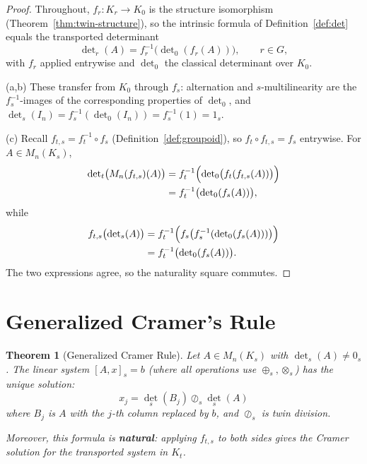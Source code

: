 \documentclass[11pt,twocolumn]{article}
\theoremstyle{plain}
\newtheorem{theorem}{Theorem}
\theoremstyle{definition}
\theoremstyle{remark}
\begin{document}
\begin{proof}
Throughout, $f_r: K_r \to K_0$ is the structure isomorphism (Theorem~\ref{thm:twin-structure}), so the intrinsic formula of Definition~\ref{def:det} equals the transported determinant
\[
\det\nolimits_r(A) = f_r^{-1}\bigl(\det\nolimits_0(f_r(A))\bigr), \qquad r \in G,
\]
with $f_r$ applied entrywise and $\det_0$ the classical determinant over $K_0$.

(a,b) These transfer from $K_0$ through $f_s$: alternation and $s$-multilinearity are the $f_s^{-1}$-images of the corresponding properties of $\det_0$, and $\det_s(I_n) = f_s^{-1}(\det_0(I_n)) = f_s^{-1}(1) = 1_s$.

(c) Recall $f_{t,s} = f_t^{-1} \circ f_s$ (Definition~\ref{def:groupoid}), so $f_t \circ f_{t,s} = f_s$ entrywise. For $A \in M_n(K_s)$,
\begin{align}
\det\nolimits_t\bigl(M_n(f_{t,s})(A)\bigr)
&= f_t^{-1}\Bigl(\det\nolimits_0\bigl(f_t(f_{t,s}(A))\bigr)\Bigr) \notag\\
&= f_t^{-1}\bigl(\det\nolimits_0(f_s(A))\bigr),
\end{align}
while
\begin{align}
f_{t,s}\bigl(\det\nolimits_s(A)\bigr)
&= f_t^{-1}\Bigl(f_s\bigl(f_s^{-1}(\det\nolimits_0(f_s(A)))\bigr)\Bigr) \notag\\
&= f_t^{-1}\bigl(\det\nolimits_0(f_s(A))\bigr).
\end{align}
The two expressions agree, so the naturality square commutes.
\end{proof}


\section{Generalized Cramer's Rule}
\label{sec:cramer}

\begin{theorem}[Generalized Cramer Rule]\label{thm:cramer}
Let $A \in M_n(K_s)$ with $\det_s(A) \neq 0_s$. The linear system $[A, x]_s = b$ (where all operations use $\oplus_s, \otimes_s$) has the unique solution:
\begin{equation}
\boxed{x_j = \det_s(B_j) \oslash_s \det_s(A)}
\end{equation}
where $B_j$ is $A$ with the $j$-th column replaced by $b$, and $\oslash_s$ is twin division.

Moreover, this formula is \textbf{natural}: applying $f_{t,s}$ to both sides gives the Cramer solution for the transported system in $K_t$.
\end{theorem}
\end{document}
